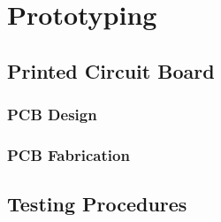 \section{Prototyping}
    \subsection{Printed Circuit Board}
        \subsubsection{PCB Design}
        \subsubsection{PCB Fabrication}
    \subsection{Testing Procedures}

